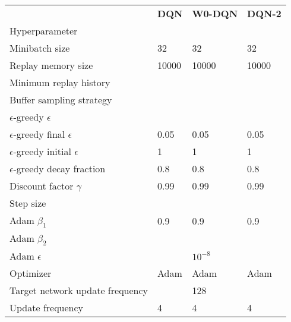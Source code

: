 \begin{tabular}{llll}
 & \bfseries DQN & \bfseries W0-DQN & \bfseries DQN-2 \\
Hyperparameter &  &  &  \\
Minibatch size & 32 & 32 & 32 \\
Replay memory size & 10000 & 10000 & 10000 \\
Minimum replay history &  &  &  \\
Buffer sampling strategy &  &  &  \\
$\epsilon$-greedy $\epsilon$ &  &  &  \\
$\epsilon$-greedy final $\epsilon$ & 0.05 & 0.05 & 0.05 \\
$\epsilon$-greedy initial $\epsilon$ & 1 & 1 & 1 \\
$\epsilon$-greedy decay fraction & 0.8 & 0.8 & 0.8 \\
Discount factor $\gamma$ & 0.99 & 0.99 & 0.99 \\
Step size &  &  &  \\
Adam $\beta_1$ & 0.9 & 0.9 & 0.9 \\
Adam $\beta_2$ &  &  &  \\
Adam $\epsilon$ &  & $10^{-8}$ &  \\
Optimizer & Adam & Adam & Adam \\
Target network update frequency &  & 128 &  \\
Update frequency & 4 & 4 & 4 \\
\end{tabular}
